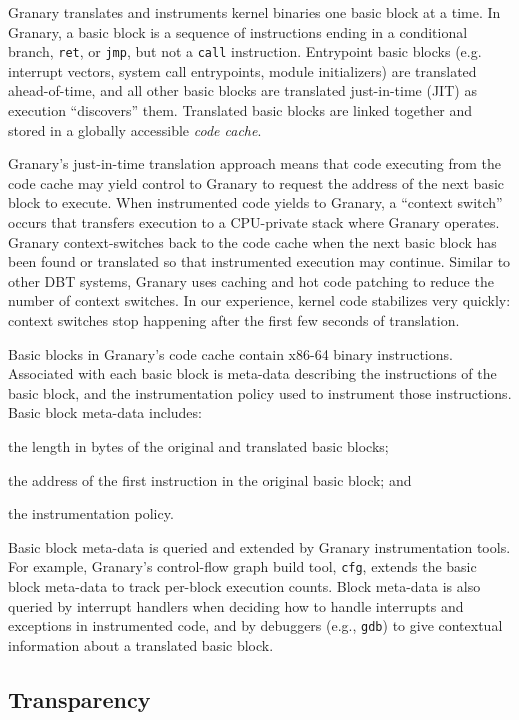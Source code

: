 \documentclass[preprint]{sigplanconf}
\begin{document}
Granary translates and instruments kernel binaries one basic block at a time. In Granary, a basic block is a sequence of instructions ending in a conditional branch, \texttt{ret}, or \texttt{jmp}, but not a \texttt{call} instruction. Entrypoint basic blocks (e.g. interrupt vectors, system call entrypoints, module initializers) are translated ahead-of-time, and all other basic blocks are translated just-in-time (JIT) as execution ``discovers'' them. Translated basic blocks are linked together and stored in a globally accessible \emph{code cache}.

Granary's just-in-time translation approach means that code executing from the code cache may yield control to Granary to request the address of the next basic block to execute. When instrumented code yields to Granary, a ``context switch'' occurs that transfers execution to a CPU-private stack where Granary operates. Granary context-switches back to the code cache when the next basic block has been found or translated so that instrumented execution may continue. Similar to other DBT systems, Granary uses caching and hot code patching to reduce the number of context switches. In our experience, kernel code stabilizes very quickly: context switches stop happening after the first few seconds of translation.

Basic blocks in Granary's code cache contain x86-64 binary instructions. Associated with each basic block is meta-data describing the instructions of the basic block, and the instrumentation policy used to instrument those instructions. Basic block meta-data includes: \begin{inparaenum}[i)]
	\item the length in bytes of the original and translated basic blocks;
	\item the address of the first instruction in the original basic block; and
	\item the instrumentation policy.
\end{inparaenum} Basic block meta-data is queried and extended by Granary instrumentation tools. For example, Granary's control-flow graph build tool, \texttt{cfg}, extends the basic block meta-data to track per-block execution counts. Block meta-data is also queried by interrupt handlers when deciding how to handle interrupts and exceptions in instrumented code, and by debuggers (e.g., \texttt{gdb}) to give contextual information about a translated basic block. 

\subsection{Transparency}\label{sec:transparency}
\end{document}
